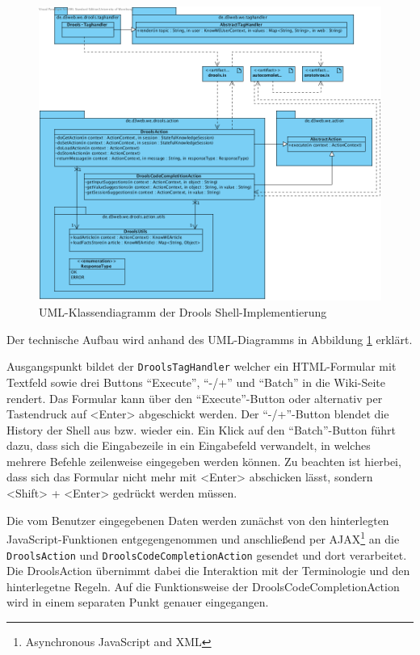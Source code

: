\documentclass[a4paper,12pt]{report}
\begin{document}
  \begin{figure}[htbp]
    \centering
      \includegraphics[width=\textwidth]{img/Actionkram.png}
    \caption{UML-Klassendiagramm der Drools Shell-Implementierung}
    \label{fig:uml_shell}
  \end{figure}

Der technische Aufbau wird anhand des UML-Diagramms in Abbildung \ref{fig:uml_shell} erklärt.

  Ausgangspunkt bildet der \texttt{DroolsTagHandler} welcher ein HTML-Formular mit Textfeld sowie drei Buttons "`Execute"', "`-/+"' und "`Batch"' in die Wiki-Seite rendert. Das Formular kann über den "`Execute"'-Button oder alternativ per Tastendruck auf <Enter> abgeschickt werden. Der "`-/+"'-Button blendet die History der Shell aus bzw. wieder ein. Ein Klick auf den "`Batch"'-Button führt dazu, dass sich die Eingabezeile in ein Eingabefeld verwandelt, in welches mehrere Befehle zeilenweise eingegeben werden können. Zu beachten ist hierbei, dass sich das Formular nicht mehr mit <Enter> abschicken lässt, sondern <Shift> + <Enter> gedrückt werden müssen. 
  
  Die vom Benutzer eingegebenen Daten werden zunächst von den hinterlegten JavaScript-Funktionen entgegengenommen und anschließend per AJAX\footnote{Asynchronous JavaScript and XML} an die \texttt{DroolsAction} und \texttt{DroolsCodeCompletionAction} gesendet und dort verarbeitet. Die DroolsAction übernimmt dabei die Interaktion mit der Terminologie und den hinterlegetne Regeln. Auf die Funktionsweise der DroolsCodeCompletionAction wird in einem separaten Punkt genauer eingegangen.
\end{document}
